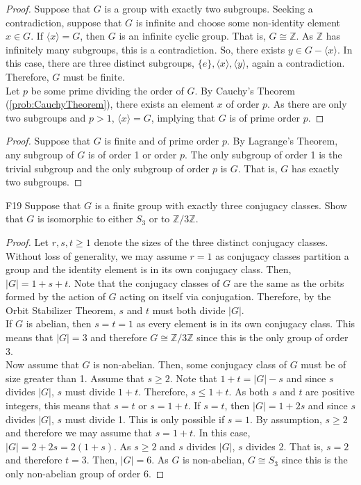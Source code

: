 \documentclass{article}
\newcommand{\Z}{\mathbb{Z}}
\theoremstyle{definition}
\begin{document}
	\begin{proof}
	Suppose that $G$ is a group with exactly two subgroups. Seeking a contradiction, suppose that $G$ is infinite and choose some non-identity element $x \in G$. If $\langle x \rangle = G$, then $G$ is an infinite cyclic group. That is, $G \cong \Z$. As $\Z$ has infinitely many subgroups, this is a contradiction. So, there exists $y \in G - \langle x \rangle$. In this case, there are three distinct subgroups, $\{e\}, \langle x \rangle, \langle y \rangle$, again a contradiction. Therefore, $G$ must be finite.\\
	
	Let $p$ be some prime dividing the order of $G$. By Cauchy's Theorem (\ref{prob:CauchyTheorem}), there exists an element $x$ of order $p$. As there are only two subgroups and $p > 1$, $\langle x \rangle = G$, implying that $G$ is of prime order $p$.
	\end{proof}
	
	\begin{proof}
	Suppose that $G$ is finite and of prime order $p$. By Lagrange's Theorem, any subgroup of $G$ is of order 1 or order $p$. The only subgroup of order 1 is the trivial subgroup and the only subgroup of order $p$ is $G$. That is, $G$ has exactly two subgroups.
	\end{proof}
	
	\begin{prob}{F19}{}
	Suppose that $G$ is a finite group with exactly three conjugacy classes. Show that $G$ is isomorphic to either $S_3$ or to $\Z/3\Z$.
	\end{prob}
	
	\begin{proof}
	Let $r,s,t \geq 1$ denote the sizes of the three distinct conjugacy classes. Without loss of generality, we may assume $r = 1$ as conjugacy classes partition a group and the identity element is in its own conjugacy class. Then, $|G| = 1 + s + t$. Note that the conjugacy classes of $G$ are the same as the orbits formed by the action of $G$ acting on itself via conjugation. Therefore, by the Orbit Stabilizer Theorem, $s$ and $t$ must both divide $|G|$.\\
	
	If $G$ is abelian, then $s = t =1$ as every element is in its own conjugacy class. This means that $|G| = 3$ and therefore $G \cong \Z/3\Z$ since this is the only group of order 3.\\
	
	Now assume that $G$ is non-abelian. Then, some conjugacy class of $G$ must be of size greater than 1. Assume that $s \geq 2$. Note that $1 + t = |G| -s$ and since $s$ divides $|G|$, $s$ must divide $1 + t$. Therefore, $s \leq 1 + t$. As both $s$ and $t$ are positive integers, this means that $s = t$ or $s = 1 + t$. If $s = t$, then $|G| = 1 + 2s$ and since $s$ divides $|G|$, $s$ must divide 1. This is only possible if $s = 1$. By assumption, $s \geq 2$ and therefore we may assume that $s = 1 + t$. In this case, $|G| = 2 + 2s = 2(1 + s)$. As $s \geq 2$ and $s$ divides $|G|$, $s$ divides 2. That is, $s = 2$ and therefore $t = 3$. Then, $|G| = 6$. As $G$ is non-abelian, $G \cong S_3$ since this is the only non-abelian group of order 6.
	\end{proof}
	
\end{document}
